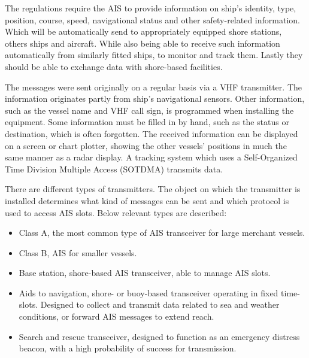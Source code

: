 The regulations require the \ac{AIS} to provide information on ship's identity, type, position, course, speed, navigational status and other safety-related information. Which will be automatically send to appropriately equipped shore stations, others ships and aircraft. While also being able to receive such information automatically from similarly fitted ships, to monitor and track them. Lastly they should be able to exchange data with shore-based facilities. 

The messages were sent originally on a regular basis via a \ac{VHF} transmitter. The information originates partly from ship's navigational sensors. Other information, such as the vessel name and \ac{VHF} call sign, is programmed when installing the equipment. Some information must be filled in by hand, such as the status or destination, which is often forgotten. The received information can be displayed on a screen or chart plotter, showing the other vessels' positions in much the same manner as a radar display. A tracking system which uses a Self-Organized Time Division Multiple Access (SOTDMA) transmits data.

There are different types of transmitters. The object on which the transmitter is installed determines what kind of messages can be sent and which protocol is used to access \ac{AIS} slots. Below relevant types are described:
\begin{itemize}
	\item Class A, the most common type of \ac{AIS} transceiver for large merchant vessels.
	\item Class B, \ac{AIS} for smaller vessels.
	\item Base station, shore-based \ac{AIS} transceiver, able to manage \ac{AIS} slots.
	\item Aids to navigation, shore- or buoy-based transceiver operating in fixed time-slots. Designed to collect and transmit data related to sea and weather conditions, or forward \ac{AIS} messages to extend reach.
	\item Search and rescue transceiver, designed to function as an emergency distress beacon, with a high probability of success for transmission.
\end{itemize}

